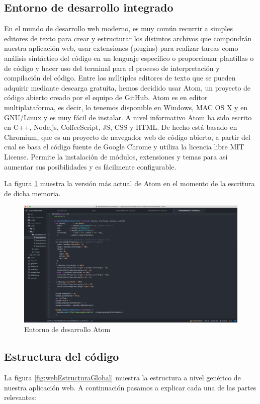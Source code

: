 \subsection{Entorno de desarrollo integrado}
En el mundo de desarrollo web moderno, es muy común recurrir a simples editores de texto para crear y estructurar los distintos archivos que compondrán nuestra aplicación web, usar extensiones (plugins) para realizar tareas como análisis sintáctico del código en un lenguaje específico o proporcionar  plantillas o  de código y hacer uso del terminal para el proceso de interpretación y compilación del código.
Entre los múltiples editores de texto que se pueden adquirir mediante descarga gratuita, hemos decidido usar Atom, un proyecto de código abierto creado por el equipo de GitHub.
Atom es en editor multiplataforma, es decir, lo tenemos disponible en Windows, MAC OS X y en GNU/Linux y es muy fácil de instalar. A nivel informativo Atom ha sido escrito en C++, Node.js, CoffeeScript, JS, CSS y HTML. De hecho está basado en Chromium, que es un proyecto de navegador web de código abierto, a partir del cual se basa el código fuente de Google Chrome y utiliza la licencia libre MIT License. Permite la instalación de módulos, extensiones y temas para así aumentar sus posibilidades y es fácilmente configurable.

La figura \ref{fig:atom} muestra la versión más actual de Atom en el momento de la escritura de dicha memoria.

\begin{figure}[h] \centering
	\includegraphics[width=15cm]{graphs/atom.png} \caption{Entorno de desarrollo Atom}\label{fig:atom}
\end{figure}

\subsection{Estructura del código}
La figura \ref{fig:webEstructuraGlobal} muestra la estructura a nivel genérico de nuestra aplicación web. A continuación pasamos a explicar cada una de las partes relevantes:

